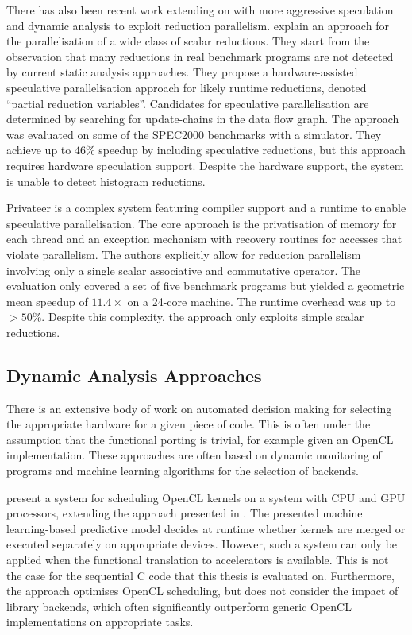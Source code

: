     There has also been recent work extending on \citet{rauchwerger1999lrpd}
    with more aggressive speculation and dynamic analysis
    \citep{aguilar2015unified} to exploit reduction parallelism.
    \citet{Han2010Speculative} explain an approach for the
    parallelisation of a wide class of scalar reductions.
    They start from the observation that many reductions in real benchmark
    programs are not detected by current static analysis approaches.
    They propose a hardware-assisted speculative parallelisation approach for
    likely runtime reductions, denoted ``partial reduction variables''.
    Candidates for speculative parallelisation are determined by searching for
    update-chains in the data flow graph.
    The approach was evaluated on some of the SPEC2000 benchmarks with a
    simulator.
    They achieve up to $46\%$ speedup by including speculative reductions, but
    this approach requires hardware speculation support.
    Despite the hardware support, the system is unable to detect histogram
    reductions.

    Privateer \citep{Johnson:2012:SSP:2254064.2254107} is a complex system
    featuring compiler support and a runtime to enable speculative
    parallelisation.
    The core approach is the privatisation of memory for each thread and an
    exception mechanism with recovery routines for accesses that violate
    parallelism.
    The authors explicitly allow for reduction parallelism involving only a
    single scalar associative and commutative operator.
    The evaluation only covered a set of five benchmark programs but yielded
    a geometric mean speedup of $11.4\times$ on a 24-core machine.
    The runtime overhead was up to $>50\%$.
    Despite this complexity, the approach only exploits simple scalar
    reductions.

\subsection{Dynamic Analysis Approaches}

    There is an extensive body of work on automated decision making for
    selecting the appropriate hardware for a given piece of code.
    This is often under the assumption that the functional porting is trivial,
    for example given an OpenCL implementation.
    These approaches are often based on dynamic monitoring of programs
    and machine learning algorithms for the selection of backends.

    \citet{Wen:2017:MSM:3038228.3038235} present a system for scheduling OpenCL
    kernels on a system with CPU and GPU processors, extending the approach
    presented in \citet{7116910}.
    The presented machine learning-based predictive model decides at runtime
    whether kernels are merged or executed separately on appropriate devices.
    However, such a system can only be applied when the functional translation
    to accelerators is available.
    This is not the case for the sequential C code that this thesis is evaluated
    on.
    Furthermore, the approach optimises OpenCL scheduling, but does not consider
    the impact of library backends, which often significantly outperform generic
    OpenCL implementations on appropriate tasks.

